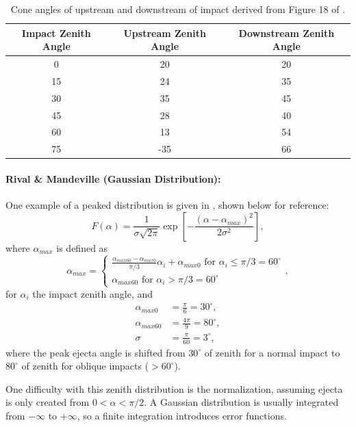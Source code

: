 \documentclass{article}
\begin{document}
\begin{table}[h]\centering
	\caption{Cone angles of upstream and downstream of impact derived from Figure 18 of \cite{gault1978experimental}.}\label{tab:upstream_downstream_angles}
	\begin{tabular}{|c | c | c |}\hline
		Impact Zenith Angle & Upstream Zenith Angle & Downstream Zenith Angle\\\hline
		0	&20	&20\\\hline
		15	&24	&35\\\hline
		30	&35	&45\\\hline
		45	&28	&40\\\hline
		60	&13	&54\\\hline
		75	&-35	&66\\\hline		
	\end{tabular}
\end{table}


\paragraph{Rival \& Mandeville (Gaussian Distribution):}
One example of a peaked distribution is given in \cite{rival1999modeling}, shown below for reference:
\begin{equation}\label{eq:Rival_zenith-dist}
F(\alpha) = \frac{1}{\sigma\sqrt{2\pi}}\exp\left[-\frac{(\alpha-\alpha_{max})^2}{2\sigma^2}\right],
\end{equation}
where $\alpha_{max}$ is defined as
\begin{equation}
\alpha_{max} = 
\begin{cases}
\frac{\alpha_{max60}-\alpha_{max0}}{\pi/3}\alpha_i + \alpha_{max0}\text{  for $\alpha_i\le \pi/3 = 60^\circ$}\\
\alpha_{max60}\text{  for $\alpha_i > \pi/3 = 60^\circ$}
\end{cases},
\end{equation}
for $\alpha_i$ the impact zenith angle, and \citep[see][]{ESABASE2_DebrisRelease10.0}
\begin{align}
\alpha_{max0} &= \frac{\pi}{6} = 30^\circ,\\
\alpha_{max60} &= \frac{4\pi}{9} = 80^\circ,\\
\sigma &= \frac{\pi}{60} = 3^\circ,
\end{align}
where the peak ejecta angle is shifted from $30^\circ$ of zenith for a normal impact to $80^\circ$ of zenith for oblique impacts ($>60^\circ$).

One difficulty with this zenith distribution is the normalization, assuming ejecta is only created from $0 < \alpha < \pi/2 $. A Gaussian distribution is usually integrated from $-\infty$ to $+\infty$, so a finite integration introduces error functions.
\end{document}
